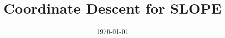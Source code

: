 \documentclass[english,a4paper]{article}
\title{Coordinate Descent for SLOPE}
\author[1,*]{}
\affil[1]{Department of Statistics, Lund University}
\affil[*]{Corresponding author: \href{}{}}
\date{\today}
\theoremstyle{plain}
\theoremstyle{definition}
\theoremstyle{remark}
\begin{document}
\maketitle

\begin{abstract}
  
\end{abstract}







\printbibliography

\appendix


\end{document}
